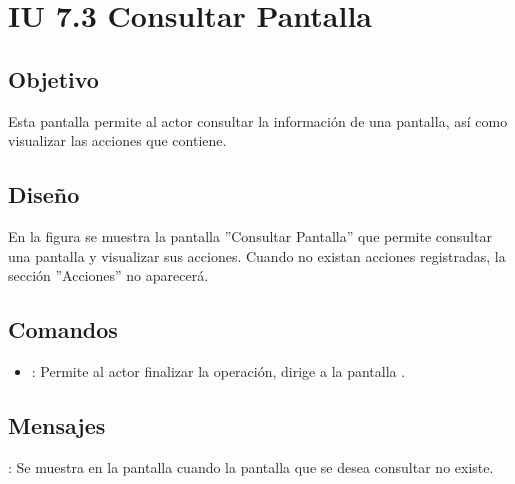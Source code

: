 \section{IU 7.3 Consultar Pantalla}

\subsection{Objetivo}
	Esta pantalla permite al actor consultar la información de una pantalla, así como visualizar las acciones que contiene.
\subsection{Diseño}
	En la figura  se muestra la pantalla ''Consultar Pantalla'' que permite consultar una pantalla y visualizar sus acciones. Cuando no existan acciones registradas, la sección ''Acciones'' no aparecerá.

\subsection{Comandos}
\begin{itemize}
	\item {}: Permite al actor finalizar la operación, dirige a la pantalla .
\end{itemize}

\subsection{Mensajes}

\begin{Citemize}
	\item {}: Se muestra en la pantalla  cuando la pantalla que se desea consultar no existe.
\end{Citemize}
